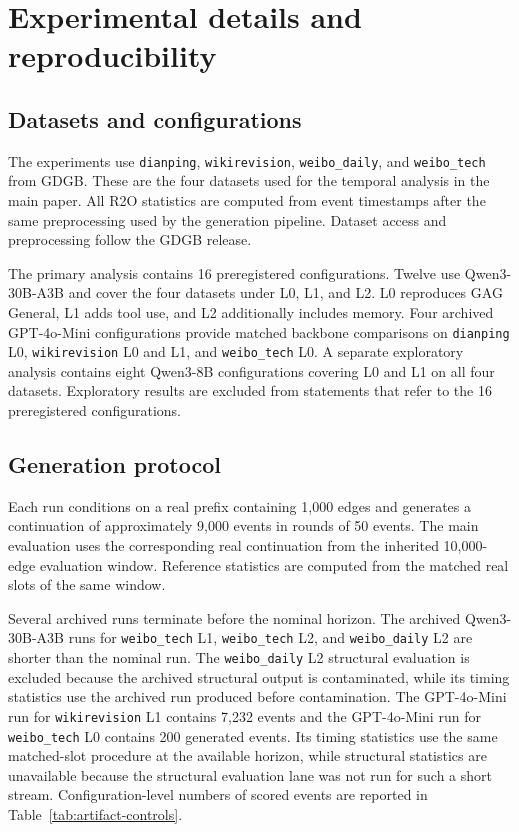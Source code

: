 \appendix

\section{Experimental details and reproducibility}
\label{app:setup}
\label{app:experimental}

\subsection{Datasets and configurations}

The experiments use \texttt{dianping}, \texttt{wikirevision},
\texttt{weibo\_daily}, and \texttt{weibo\_tech} from GDGB. These are the four
datasets used for the temporal analysis in the main paper. All R2O statistics
are computed from event timestamps after the same preprocessing used by the
generation pipeline. Dataset access and preprocessing follow the GDGB release.

The primary analysis contains 16 preregistered configurations. Twelve use
Qwen3-30B-A3B and cover the four datasets under L0, L1, and L2. L0 reproduces
GAG General, L1 adds tool use, and L2 additionally includes memory. Four
archived GPT-4o-Mini configurations provide matched backbone comparisons on
\texttt{dianping} L0, \texttt{wikirevision} L0 and L1, and
\texttt{weibo\_tech} L0. A separate exploratory analysis contains eight
Qwen3-8B configurations covering L0 and L1 on all four datasets. Exploratory
results are excluded from statements that refer to the 16 preregistered
configurations.

\subsection{Generation protocol}

Each run conditions on a real prefix containing 1,000 edges and generates a
continuation of approximately 9,000 events in rounds of 50 events. The main
evaluation uses the corresponding real continuation from the inherited
10,000-edge evaluation window. Reference statistics are computed from the
matched real slots of the same window.

Several archived runs terminate before the nominal horizon. The archived
Qwen3-30B-A3B runs for \texttt{weibo\_tech} L1,
\texttt{weibo\_tech} L2, and \texttt{weibo\_daily} L2 are shorter than the
nominal run. The \texttt{weibo\_daily} L2 structural evaluation is excluded
because the archived structural output is contaminated, while its timing
statistics use the archived run produced before contamination. The
GPT-4o-Mini run for \texttt{wikirevision} L1 contains 7,232 events and the
GPT-4o-Mini run for \texttt{weibo\_tech} L0 contains 200 generated events.
Its timing statistics use the same matched-slot procedure at the available
horizon, while structural statistics are unavailable because the structural
evaluation lane was not run for such a short stream. Configuration-level
numbers of scored events are reported in Table~\ref{tab:artifact-controls}.

